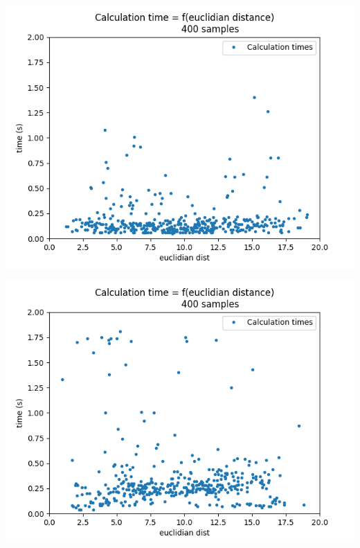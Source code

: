 \documentclass[a4paper,12pt]{report}
\begin{document}
\begin{minipage}[b]{0.45\textwidth}
	\begin{center}
		\includegraphics[width=1\linewidth]{images/calc_f(euclid)_noinit.png}
		\label{fig:calc_f(euclid)_noinit}
	\end{center}
\end{minipage}
\hfill
\begin{minipage}[b]{0.45\textwidth}
	\begin{center}
		\includegraphics[width=1\linewidth]{images/calc_f(euclid)_init.png}
		\label{fig:calc_f(euclid)_init}
	\end{center}
\end{minipage}
\vspace{0.5cm}
\end{document}
